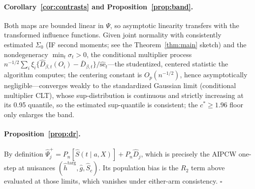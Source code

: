 \documentclass[11pt]{article}
\theoremstyle{remark}
\newcommand{\Pn}{P_n}
\begin{document}
\paragraph{Corollary~\ref{cor:contrasts} and Proposition~\ref{prop:band}.} Both maps are bounded linear in $\Psi$, so asymptotic linearity transfers with the transformed influence functions. Given joint normality with consistently estimated $\Sigma_0$ (IF second moments; see the Theorem~\ref{thm:main} sketch) and the nondegeneracy $\min_t \sigma_t > 0$, the conditional multiplier process $n^{-1/2}\sum_i \xi_i \{\widehat D_{\beta,t}(O_i) - \bar D_{\beta,t}\}/\widehat{\mathrm{se}}_t$---the studentized, centered statistic the algorithm computes; the centering constant is $O_p(n^{-1/2})$, hence asymptotically negligible---converges weakly to the standardized Gaussian limit (conditional multiplier CLT), whose sup-distribution is continuous and strictly increasing at its 0.95 quantile, so the estimated sup-quantile is consistent; the $c^*\ge1.96$ floor only enlarges the band.

\paragraph{Proposition~\ref{prop:dr}.} By definition $\widehat\Psi^{+}_j = \Pn[\hat S(t\mid a, X)] + \Pn \widehat D_j$, which is precisely the AIPCW one-step at nuisances $(\hat h^{\mathrm{targ}}, \hat g, \hat S_c)$. Its population bias is the $R_2$ term above evaluated at those limits, which vanishes under either-arm consistency. \hfill$\square$
\end{document}
